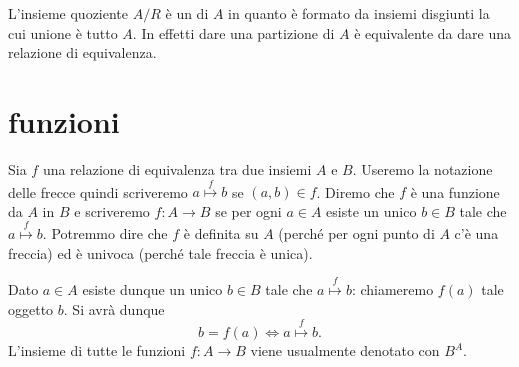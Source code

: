 L'insieme quoziente $A/R$ è un  di $A$ in quanto 
è formato da insiemi disgiunti la cui unione è tutto $A$. In effetti 
dare una partizione di $A$ è equivalente da dare una relazione 
di equivalenza.

\section{funzioni}

Sia $f$ una relazione di equivalenza tra due insiemi $A$ e $B$. 
Useremo la notazione delle frecce quindi scriveremo $a\stackrel f\mapsto b$ 
se $(a,b)\in f$. 
Diremo che $f$ è una funzione da $A$ in $B$ e scriveremo 
$f\colon A\to B$ se per ogni $a\in A$ esiste un unico $b\in B$ 
tale che $a \stackrel f \mapsto b$.
Potremmo dire che $f$ è definita su $A$ 
(perché per ogni punto di $A$ c'è una freccia)
ed è univoca (perché tale freccia è unica).

Dato $a\in A$ esiste dunque un unico $b\in B$ tale che
$a\stackrel f \mapsto b$: chiameremo $f(a)$ tale oggetto $b$.
Si avrà dunque
\[
 b=f(a) \iff a\stackrel f \mapsto b.
\]
L'insieme di tutte le funzioni $f\colon A\to B$ viene usualmente denotato con $B^A$.
%
%
%

